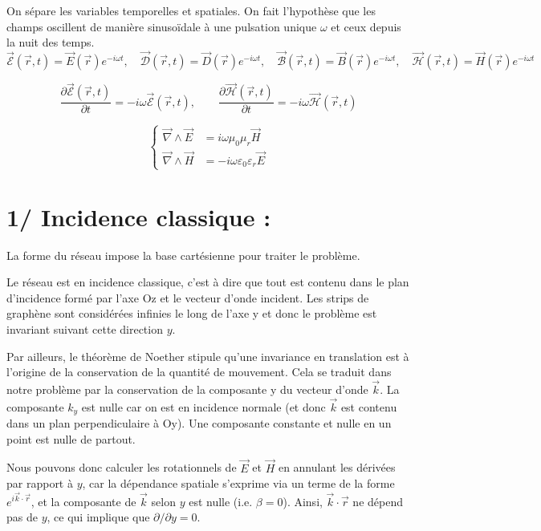 \documentclass{article}
\begin{document}
On sépare les variables temporelles et spatiales. On fait l’hypothèse que les champs oscillent de manière sinusoïdale à une pulsation unique \(\omega\) et ceux depuis la nuit des temps.
\[
\vec{\mathcal{E}}(\vec{r}, t) = \vec{E}(\vec{r}) e^{-i \omega t}, \quad
\vec{\mathcal{D}}(\vec{r}, t) = \vec{D}(\vec{r}) e^{-i \omega t}, \quad
\vec{\mathcal{B}}(\vec{r}, t) = \vec{B}(\vec{r}) e^{-i \omega t}, \quad
\vec{\mathcal{H}}(\vec{r}, t) = \vec{H}(\vec{r}) e^{-i \omega t}
\]

\[
\frac{\partial \vec{\mathcal{E}}(\vec{r}, t)}{\partial t} = -i \omega \vec{\mathcal{E}}(\vec{r}, t), \qquad
\frac{\partial \vec{\mathcal{H}}(\vec{r}, t)}{\partial t} = -i \omega \vec{\mathcal{H}}(\vec{r}, t)
\]

\[
\left\{
\begin{aligned}
\vec{\nabla} \wedge \vec{E} &= i \omega \mu_0 \mu_r \vec{H} \\
\vec{\nabla} \wedge \vec{H} &= - i \omega \varepsilon_0 \varepsilon_r \vec{E}
\end{aligned}
\right.
\]
\section*{1/ Incidence classique : }
La forme du réseau impose la base cartésienne pour traiter le problème.

Le réseau est en incidence classique, c'est à dire que tout est contenu dans le plan d'incidence formé par l'axe Oz et le vecteur d'onde incident. Les strips de graphène sont considérées infinies le long de l'axe y et donc le problème est invariant suivant cette direction \(y\).  \\ \par Par ailleurs, le théorème de Noether stipule qu'une invariance en translation est à l'origine de la conservation de la quantité de mouvement. Cela se traduit dans notre problème par la conservation de la composante y du vecteur d'onde \(\vec{k}\). La composante \(k_y\) est nulle car on est en incidence normale (et donc \(\vec{k}\) est contenu dans un plan perpendiculaire à Oy). Une composante constante et nulle en un point est nulle de partout.

Nous pouvons donc calculer les rotationnels de \( \vec{E} \) et \( \vec{H} \) en annulant les dérivées par rapport à \( y \), car la dépendance spatiale s’exprime via un terme de la forme \( e^{i\vec{k} \cdot \vec{r}} \), et la composante de \( \vec{k} \) selon \( y \) est nulle (i.e. \( \beta = 0 \)). Ainsi, \( \vec{k} \cdot \vec{r} \) ne dépend pas de \( y \), ce qui implique que \( \partial / \partial y = 0 \).
\end{document}
